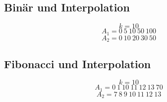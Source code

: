 \documentclass[10pt,a4paper]{article}
\begin{document}
\subsection{Binär und Interpolation}
\begin{equation}
  k = 10
\end{equation}
\begin{equation}
  A_{1} = 0\ 5\ 10\ 50\ 100
\end{equation}
\begin{equation}
  A_{2} = 0\ 10\ 20\ 30\ 50
\end{equation}

\subsection{Fibonacci und Interpolation}
\begin{equation}
  k = 10
\end{equation}
\begin{equation}
  A_{1} = 0\ 1\ 10\ 11\ 12\ 13\ 70
\end{equation}
\begin{equation}
  A_{2} = 7\ 8\ 9\ 10\ 11\ 12\ 13
\end{equation}
\end{document}
